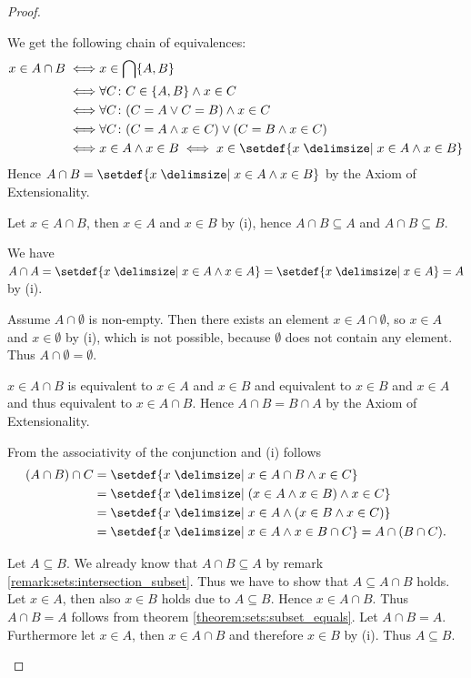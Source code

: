 \begin{proof}
    \begin{proofenumerate}
        \item We get the following chain of equivalences:
        \begin{align}\begin{split}x\in A\cap B \iff& x\in \bigcap\{A,B\}\\\iff&\forall C\colon C\in\{A,B\}\land x\in C\\
        \iff& \forall C\colon (C=A\lor C=B)\land x\in C\\
        \iff& \forall C\colon (C=A\land x\in C)\lor (C=B\land x\in C)\\
        \iff& x\in A\land x\in B\iff x\in\setdef{x\given x\in A\land x\in B}
        \end{split}\end{align}
        Hence $A\cap B=\setdef{x\given x\in A\land x\in B}$ by the Axiom of Extensionality.
        \item Let $x\in A\cap B$, then $x\in A$ and $x\in B$ by (i), hence $A\cap B\subseteq A$ and $A\cap B\subseteq B$.
        \item We have $A\cap A=\setdef{x\given x\in A\land x\in A}=\setdef{x\given x\in A}=A$ by (i).
        \item Assume $A\cap\emptyset$ is non-empty. Then there exists an element $x\in A\cap\emptyset$, so $x\in A$ and $x\in\emptyset$ by (i), which is not possible, because $\emptyset$ does not contain any element. Thus $A\cap\emptyset=\emptyset$.
        \item $x\in A\cap B$ is equivalent to $x\in A$ and $x\in B$ and equivalent to $x\in B$ and $x\in A$ and thus equivalent to $x\in A\cap B$. Hence $A\cap B=B\cap A$ by the Axiom of Extensionality.
        \item From the associativity of the conjunction and (i) follows \begin{align}\begin{split}(A\cap B)\cap C&=\setdef{x\given x\in A\cap B\land x\in C}\\&=\setdef{x\given (x\in A\land x\in B)\land x\in C}\\&=\setdef{x\given x\in A\land (x\in B\land x\in C)}\\&=\setdef{x\given x\in A\land x\in B\cap C}=A\cap (B\cap C).\end{split}\end{align}
        \item \proofright Let $A\subseteq B$. We already know that $A\cap B\subseteq A$ by remark \ref{remark:sets:intersection_subset}. Thus we have to show that $A\subseteq A\cap B$ holds. Let $x\in A$, then also $x\in B$ holds due to $A\subseteq B$. Hence $x\in A\cap B$. Thus $A\cap B=A$ follows from theorem \ref{theorem:sets:subset_equals}.
        \proofleft Let $A\cap B=A$. Furthermore let $x\in A$, then $x\in A\cap B$ and therefore $x\in B$ by (i). Thus $A\subseteq B$.
    \end{proofenumerate}
\end{proof}

